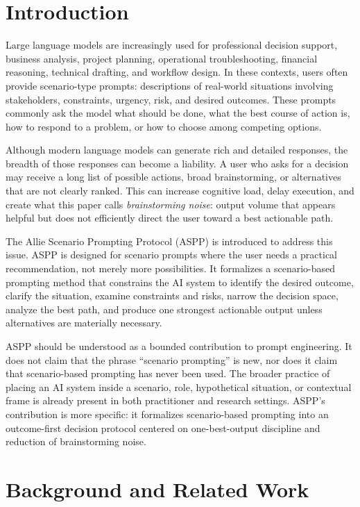 \documentclass[11pt]{article}
\begin{document}
\section{Introduction}

Large language models are increasingly used for professional decision support, business analysis, project planning, operational troubleshooting, financial reasoning, technical drafting, and workflow design. In these contexts, users often provide scenario-type prompts: descriptions of real-world situations involving stakeholders, constraints, urgency, risk, and desired outcomes. These prompts commonly ask the model what should be done, what the best course of action is, how to respond to a problem, or how to choose among competing options.

Although modern language models can generate rich and detailed responses, the breadth of those responses can become a liability. A user who asks for a decision may receive a long list of possible actions, broad brainstorming, or alternatives that are not clearly ranked. This can increase cognitive load, delay execution, and create what this paper calls \textit{brainstorming noise}: output volume that appears helpful but does not efficiently direct the user toward a best actionable path.

The Allie Scenario Prompting Protocol (ASPP) is introduced to address this issue. ASPP is designed for scenario prompts where the user needs a practical recommendation, not merely more possibilities. It formalizes a scenario-based prompting method that constrains the AI system to identify the desired outcome, clarify the situation, examine constraints and risks, narrow the decision space, analyze the best path, and produce one strongest actionable output unless alternatives are materially necessary.

ASPP should be understood as a bounded contribution to prompt engineering. It does not claim that the phrase ``scenario prompting'' is new, nor does it claim that scenario-based prompting has never been used. The broader practice of placing an AI system inside a scenario, role, hypothetical situation, or contextual frame is already present in both practitioner and research settings. ASPP's contribution is more specific: it formalizes scenario-based prompting into an outcome-first decision protocol centered on one-best-output discipline and reduction of brainstorming noise.

\section{Background and Related Work}
\end{document}
